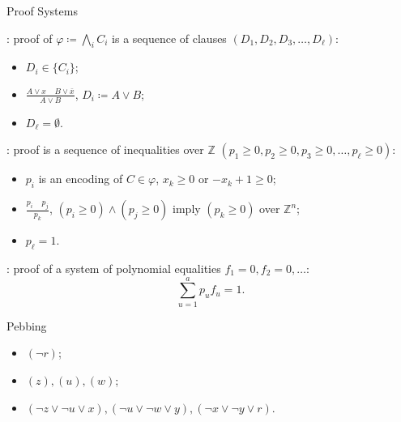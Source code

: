 \begin{frame}{Proof Systems}

    : proof of $\varphi \coloneqq \bigwedge\limits_{i} C_i$ is a sequence of clauses
    $(D_1, D_2, D_3, \dots, D_{\ell})$:
    \pause
    
    \begin{minipage}{0.3\linewidth}
        \begin{itemize}
            \item $D_i \in \{C_i\}$;
                \pause
            \item $\frac{A \lor x ~~~~~ B \lor \bar{x}}{A \lor B}$, $D_i \coloneqq A \lor B$;
                \pause
            \item $D_{\ell} = \emptyset$.
        \end{itemize}
    \end{minipage}
    \pause
    \begin{minipage}{0.68\linewidth}
        \centering
        
    \end{minipage}


    \pause
    \vspace{0.3cm}

    : proof is a sequence of inequalities over $\mathbb{Z}$
    $(p_1 \ge 0, p_2 \ge 0, p_3 \ge 0, \dots, p_{\ell} \ge 0)$:
    \begin{itemize}
        \item $p_i$ is an encoding of $C \in \varphi$, $x_k \ge 0$ or $-x_k + 1 \ge 0$;
        \item $\frac{p_i ~~~~~ p_j}{p_k}$,  $(p_i \ge 0) \land (p_j \ge 0)$ imply $(p_k \ge 0)$
            \alert{over $\mathbb{Z}^n$};
        \item $p_{\ell} = 1$.
    \end{itemize}

    \pause
    \vspace{0.3cm}

    : proof of a system of polynomial equalities $f_1 = 0, f_2 = 0, \dots$:
    $$
        \sum_{u = 1}^{a} p_u f_u = 1.
    $$
\end{frame}


\begin{frame}{Pebbing}

    \begin{center}
                
    \end{center}

    \pause
    \begin{itemize}
        \item $(\neg r)$;
            \pause
        \item $(z), (u), (w)$;
            \pause
        \item $(\neg z \lor \neg u \lor x), (\neg u \lor \neg w \lor y),
            (\neg x \lor \neg y \lor r)$.
    \end{itemize}

    \pause
    
\end{frame}

